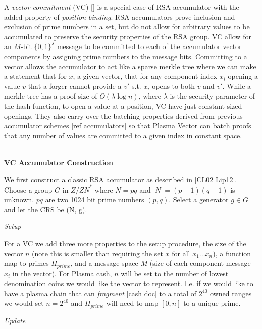\documentclass[11pt]{article}
\begin{document}
A \textit{vector commitment} (VC) [] is a special case of RSA accumulator with the added property of \textit{position binding}. RSA accumulators prove inclusion and exclusion of prime numbers in a set, but do not allow for arbitrary values to be accumulated to preserve the security properties of the RSA group. VC allow for an $M$-bit $\{0,1\}^\lambda$ message to be committed to each of the accumulator vector components by assigning prime numbers to the message bits. Committing to a vector allows the accumulator to act like a sparse merkle tree where we can make a statement that for $x$, a given vector, that for any component index $x_i$ opening a value $v$ that a forger cannot provide a $v'$ s.t. $x_i$ opens to both $v$ and $v'$. While a merkle tree has a proof size of $O(\lambda \log n)$, where $\lambda$ is the security parameter of the hash function, to open a value at a position, VC have just constant sized openings. They also carry over the batching properties derived from previous accumulator schemes [ref accumulators] so that Plasma Vector can batch proofs that any number of values are committed to a given index in constant space.
\\
\\

\centerline{\textbf{VC Accumulator Construction}}

We first construct a classic RSA accumulator as described in [CL02 Lip12]. Choose a group $G$ in ${Z/ZN}^*$ where $N=pq$ and $|N| = (p-1)(q-1)$ is unknown. $pq$ are two 1024 bit prime numbers $(p,q)$. Select a generator $g \in G$ and let the CRS be (N, g).
\\

\centerline{\textit{Setup}}

For a VC we add three more properties to the setup procedure, the size of the vector $n$ (note this is smaller than requiring the set $x$ for all $x_1...x_n$), a function map to primes $H_{prime}$, and a message space $M$ (size of each component message $x_i$ in the vector). For Plasma cash, $n$ will be set to the number of lowest denomination coins we would like the vector to represent. I.e. if we would like to have a plasma chain that can \textit{fragment} [cash doc] to a total of $2^{40}$ owned ranges we would set $n=2^{40}$ and $H_{prime}$ will need to map $[0,n]$ to a unique prime.
\\

\centerline{\textit{Update}}
\end{document}
